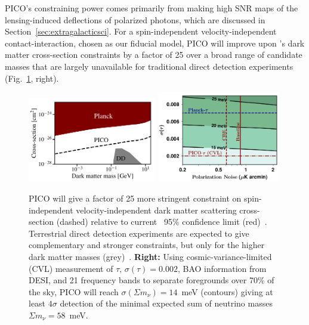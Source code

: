 \documentclass[PICOReport.tex]{subfiles}
\begin{document}
PICO's constraining power comes primarily from making high \ac{SNR} maps of the lensing-induced deflections of polarized photons, which are discussed in Section~\ref{sec:extragalacticsci}.  For a spin-independent velocity-independent contact-interaction, chosen as our fiducial model, PICO will improve upon \planck 's dark matter cross-section constraints by a factor of 25 over a broad range of candidate masses that 
are largely unavailable for traditional direct detection experiments (Fig.~\ref{fig:DM_baryons}, right). 

\begin{figure}[t]
\begin{center}
\includegraphics[width=0.50\textwidth]{images/pico_dd4.pdf}
\includegraphics[width=0.48\textwidth]{images/Mnu_tauprior_final.pdf}
\vspace{-0.15in}
\caption{ PICO will give a factor of 25 more stringent constraint on spin-independent velocity-independent dark matter scattering cross-section (dashed) relative to current \planck\ 95\% confidence limit (red)~\citep{2018PhRvL.121h1301G}. Terrestrial direct detection experiments are expected to give complementary and stronger constraints, but only for the higher dark matter masses (grey)~\cite{2018PhRvD..97l3013K}. 
{\bf Right:} Using cosmic-variance-limited (CVL) measurement of $\tau,\, \sigma(\tau)=0.002$, \ac{BAO} information from DESI, and 21 frequency bands to separate foregrounds over 70\% of the sky, PICO will reach $\sigma(\Sigma m_{\nu}) = 14$~meV (contours) giving at least $4\sigma$ detection of the minimal expected sum of neutrino masses $\Sigma m_{\nu} = 58$~meV. 
\label{fig:DM_baryons} }
\end{center}
\vspace{-0.2in}
\end{figure}
%
\end{document}
